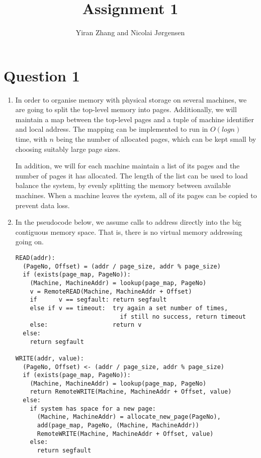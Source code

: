 \documentclass[11pt]{article}
\title          {Assignment 1}
\author         {Yiran Zhang and Nicolai Jørgensen}
\begin{document}
\maketitle
\newpage

\section{Question 1}

\begin{enumerate}

  \item
    In order to organise memory with physical storage on several machines, we are
    going to split the top-level memory into pages. Additionally, we will maintain a
    map between the top-level pages and a tuple of machine identifier and local
    address. The mapping can be implemented to run in $O(log n)$ time, with $n$ being the
    number of allocated pages, which can be kept small by choosing suitably large
    page sizes.

    In addition, we will for each machine maintain a list of its pages and the
    number of pages it has allocated. The length of the list can be used to load
    balance the system, by evenly splitting the memory between available machines.
    When a machine leaves the system, all of its pages can be copied to prevent data
    loss.

  \item
    In the pseudocode below, we assume calls to address directly into the big
    contiguous memory space. That is, there is no virtual memory addressing going
    on.
\begin{verbatim}
READ(addr):
  (PageNo, Offset) = (addr / page_size, addr % page_size)
  if (exists(page_map, PageNo)):
    (Machine, MachineAddr) = lookup(page_map, PageNo)
    v = RemoteREAD(Machine, MachineAddr + Offset)
    if      v == segfault: return segfault
    else if v == timeout:  try again a set number of times,
                             if still no success, return timeout
    else:                  return v
  else:
    return segfault

WRITE(addr, value):
  (PageNo, Offset) <- (addr / page_size, addr % page_size)
  if (exists(page_map, PageNo)):
    (Machine, MachineAddr) = lookup(page_map, PageNo)
    return RemoteWRITE(Machine, MachineAddr + Offset, value)
  else:
    if system has space for a new page:
      (Machine, MachineAddr) = allocate_new_page(PageNo),
      add(page_map, PageNo, (Machine, MachineAddr))
      RemoteWRITE(Machine, MachineAddr + Offset, value)
    else:
      return segfault


\end{verbatim}
\end{enumerate}
\end{document}
